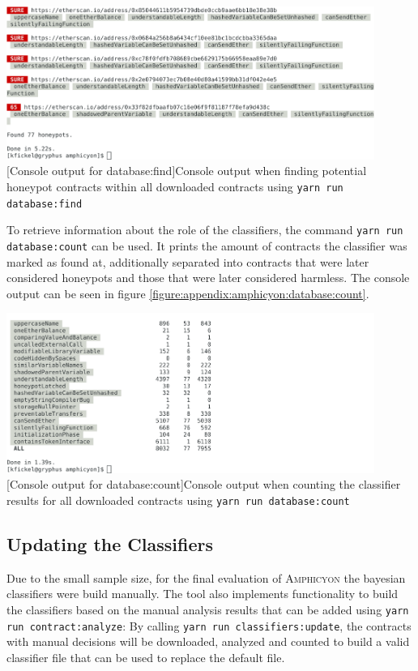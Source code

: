 \vspace{1em}
\begin{minipage}{\linewidth}
	\centering
	\includegraphics[width=12cm]{img/amphicyon/database_find.pdf}
	[Console output for database:find]{Console output when finding potential honeypot contracts within all downloaded contracts using \texttt{yarn run database:find}}
	\label{figure:appendix:amphicyon:database:find}
\end{minipage}

To retrieve information about the role of the classifiers, the command \texttt{yarn run database:count} can be used. It prints the amount of contracts the classifier was marked as found at, additionally separated into contracts that were later considered honeypots and those that were later considered harmless. The console output can be seen in figure \ref{figure:appendix:amphicyon:database:count}.

\vspace{1em}
\begin{minipage}{\linewidth}
	\centering
	\includegraphics[width=12cm]{img/amphicyon/database_count.pdf}
	[Console output for database:count]{Console output when counting the classifier results for all downloaded contracts using \texttt{yarn run database:count}}
	\label{figure:appendix:amphicyon:database:count}
\end{minipage}

\subsection{Updating the Classifiers}
Due to the small sample size, for the final evaluation of \textsc{Amphicyon} the bayesian classifiers were build manually. The tool also implements functionality to build the classifiers based on the manual analysis results that can be added using \texttt{yarn run contract:analyze}: By calling \texttt{yarn run classifiers:update}, the contracts with manual decisions will be downloaded, analyzed and counted to build a valid classifier file that can be used to replace the default file.

\pagebreak{}
